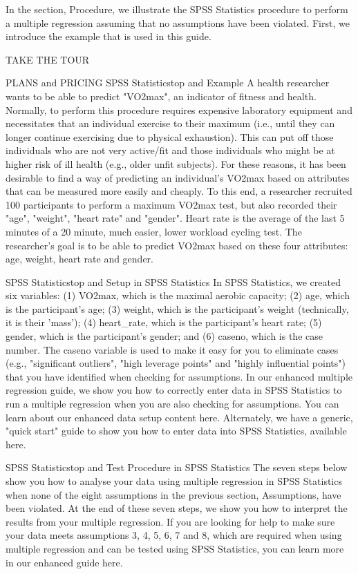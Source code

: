 \documentclass[]{article}
\begin{document}
	In the section, Procedure, we illustrate the SPSS Statistics procedure to perform a multiple regression assuming that no assumptions have been violated. First, we introduce the example that is used in this guide.
	
	TAKE THE TOUR
	
	PLANS and PRICING
	SPSS Statisticstop and
	Example
	A health researcher wants to be able to predict "VO2max", an indicator of fitness and health. Normally, to perform this procedure requires expensive laboratory equipment and necessitates that an individual exercise to their maximum (i.e., until they can longer continue exercising due to physical exhaustion). This can put off those individuals who are not very active/fit and those individuals who might be at higher risk of ill health (e.g., older unfit subjects). For these reasons, it has been desirable to find a way of predicting an individual's VO2max based on attributes that can be measured more easily and cheaply. To this end, a researcher recruited 100 participants to perform a maximum VO2max test, but also recorded their "age", "weight", "heart rate" and "gender". Heart rate is the average of the last 5 minutes of a 20 minute, much easier, lower workload cycling test. The researcher's goal is to be able to predict VO2max based on these four attributes: age, weight, heart rate and gender.
	
	SPSS Statisticstop and
	Setup in SPSS Statistics
	In SPSS Statistics, we created six variables: (1) VO2max, which is the maximal aerobic capacity; (2) age, which is the participant's age; (3) weight, which is the participant's weight (technically, it is their 'mass'); (4) heart\_rate, which is the participant's heart rate; (5) gender, which is the participant's gender; and (6) caseno, which is the case number. The caseno variable is used to make it easy for you to eliminate cases (e.g., "significant outliers", "high leverage points" and "highly influential points") that you have identified when checking for assumptions. In our enhanced multiple regression guide, we show you how to correctly enter data in SPSS Statistics to run a multiple regression when you are also checking for assumptions. You can learn about our enhanced data setup content here. Alternately, we have a generic, "quick start" guide to show you how to enter data into SPSS Statistics, available here.
	
	SPSS Statisticstop and
	Test Procedure in SPSS Statistics
	The seven steps below show you how to analyse your data using multiple regression in SPSS Statistics when none of the eight assumptions in the previous section, Assumptions, have been violated. At the end of these seven steps, we show you how to interpret the results from your multiple regression. If you are looking for help to make sure your data meets assumptions 3, 4, 5, 6, 7 and 8, which are required when using multiple regression and can be tested using SPSS Statistics, you can learn more in our enhanced guide here.
	
\end{document}
